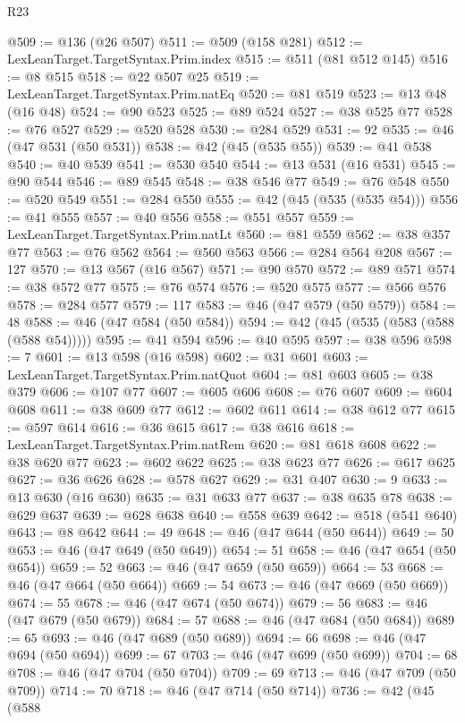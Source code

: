 \begin{lexlean}{R23}
\begin{coremodule}
@509 := @136 (@26 @507)
@511 := @509 (@158 @281)
@512 := LexLeanTarget.TargetSyntax.Prim.index
@515 := @511 (@81 @512 @145)
@516 := @8 @515
@518 := @22 @507 @25
@519 := LexLeanTarget.TargetSyntax.Prim.natEq
@520 := @81 @519
@523 := @13 @48 (@16 @48)
@524 := @90 @523
@525 := @89 @524
@527 := @38 @525 @77
@528 := @76 @527
@529 := @520 @528
@530 := @284 @529
@531 := 92
@535 := @46 (@47 @531 (@50 @531))
@538 := @42 (@45 (@535 @55))
@539 := @41 @538
@540 := @40 @539
@541 := @530 @540
@544 := @13 @531 (@16 @531)
@545 := @90 @544
@546 := @89 @545
@548 := @38 @546 @77
@549 := @76 @548
@550 := @520 @549
@551 := @284 @550
@555 := @42 (@45 (@535 (@535 @54)))
@556 := @41 @555
@557 := @40 @556
@558 := @551 @557
@559 := LexLeanTarget.TargetSyntax.Prim.natLt
@560 := @81 @559
@562 := @38 @357 @77
@563 := @76 @562
@564 := @560 @563
@566 := @284 @564 @208
@567 := 127
@570 := @13 @567 (@16 @567)
@571 := @90 @570
@572 := @89 @571
@574 := @38 @572 @77
@575 := @76 @574
@576 := @520 @575
@577 := @566 @576
@578 := @284 @577
@579 := 117
@583 := @46 (@47 @579 (@50 @579))
@584 := 48
@588 := @46 (@47 @584 (@50 @584))
@594 := @42 (@45 (@535 (@583 (@588 (@588 @54)))))
@595 := @41 @594
@596 := @40 @595
@597 := @38 @596
@598 := 7
@601 := @13 @598 (@16 @598)
@602 := @31 @601
@603 := LexLeanTarget.TargetSyntax.Prim.natQuot
@604 := @81 @603
@605 := @38 @379
@606 := @107 @77
@607 := @605 @606
@608 := @76 @607
@609 := @604 @608
@611 := @38 @609 @77
@612 := @602 @611
@614 := @38 @612 @77
@615 := @597 @614
@616 := @36 @615
@617 := @38 @616
@618 := LexLeanTarget.TargetSyntax.Prim.natRem
@620 := @81 @618 @608
@622 := @38 @620 @77
@623 := @602 @622
@625 := @38 @623 @77
@626 := @617 @625
@627 := @36 @626
@628 := @578 @627
@629 := @31 @407
@630 := 9
@633 := @13 @630 (@16 @630)
@635 := @31 @633 @77
@637 := @38 @635 @78
@638 := @629 @637
@639 := @628 @638
@640 := @558 @639
@642 := @518 (@541 @640)
@643 := @8 @642
@644 := 49
@648 := @46 (@47 @644 (@50 @644))
@649 := 50
@653 := @46 (@47 @649 (@50 @649))
@654 := 51
@658 := @46 (@47 @654 (@50 @654))
@659 := 52
@663 := @46 (@47 @659 (@50 @659))
@664 := 53
@668 := @46 (@47 @664 (@50 @664))
@669 := 54
@673 := @46 (@47 @669 (@50 @669))
@674 := 55
@678 := @46 (@47 @674 (@50 @674))
@679 := 56
@683 := @46 (@47 @679 (@50 @679))
@684 := 57
@688 := @46 (@47 @684 (@50 @684))
@689 := 65
@693 := @46 (@47 @689 (@50 @689))
@694 := 66
@698 := @46 (@47 @694 (@50 @694))
@699 := 67
@703 := @46 (@47 @699 (@50 @699))
@704 := 68
@708 := @46 (@47 @704 (@50 @704))
@709 := 69
@713 := @46 (@47 @709 (@50 @709))
@714 := 70
@718 := @46 (@47 @714 (@50 @714))
@736 := @42
    (@45
      (@588

\end{coremodule}
\end{lexlean}
